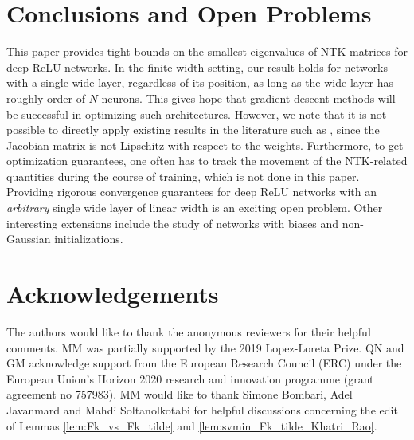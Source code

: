 \documentclass[11pt]{article}
\newcommand{\revision}[1]{#1}
\begin{document}
\section{Conclusions and Open Problems}

This paper provides tight bounds on the smallest eigenvalues of NTK matrices for deep ReLU networks. In the finite-width setting, our result holds for networks
with a single wide layer, regardless of its position, as long as the wide layer has roughly order of $N$ neurons. This gives hope that gradient descent methods will be successful in optimizing such architectures.
However, we note that it is not possible to directly apply existing results in the literature such as \citep{ChizatEtc2019},
since the Jacobian matrix is not Lipschitz with respect to the weights. Furthermore, to get optimization guarantees, one often has to track the movement of the NTK-related quantities during the course of training,
which is not done in this paper. Providing rigorous convergence guarantees for deep ReLU networks 
with an {\em arbitrary} single wide layer of linear width is an exciting open problem. Other interesting extensions include the study of networks with biases and non-Gaussian initializations.





 \section*{Acknowledgements}
The authors would like to thank the anonymous reviewers for their helpful comments. MM was partially supported by the 2019 Lopez-Loreta Prize.
 QN and GM acknowledge support from the European Research Council (ERC)
 under the European Union’s Horizon 2020 research and innovation
 programme (grant agreement no 757983). \revision{MM would like to thank Simone Bombari, Adel Javanmard and Mahdi Soltanolkotabi for helpful discussions concerning the edit of Lemmas \ref{lem:Fk_vs_Fk_tilde} and \ref{lem:svmin_Fk_tilde_Khatri_Rao}.}
 
\end{document}
